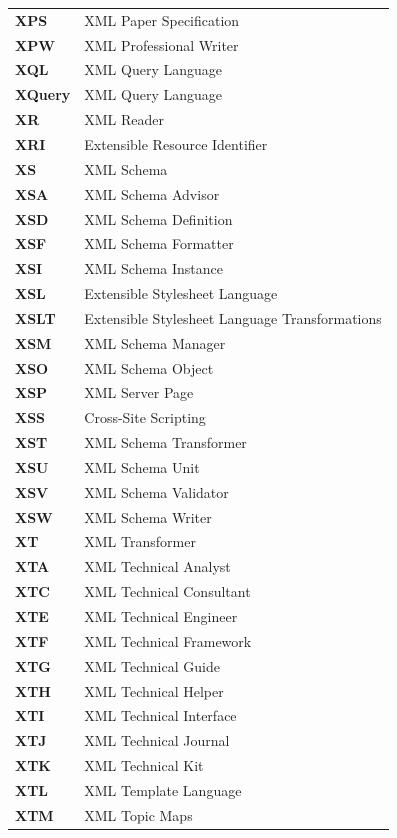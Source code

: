 \begin{longtable}{p{3cm}p{11cm}}
\textbf{XPS} & XML Paper Specification \\
\textbf{XPW} & XML Professional Writer \\
\textbf{XQL} & XML Query Language \\
\textbf{XQuery} & XML Query Language \\
\textbf{XR} & XML Reader \\
\textbf{XRI} & Extensible Resource Identifier \\
\textbf{XS} & XML Schema \\
\textbf{XSA} & XML Schema Advisor \\
\textbf{XSD} & XML Schema Definition \\
\textbf{XSF} & XML Schema Formatter \\
\textbf{XSI} & XML Schema Instance \\
\textbf{XSL} & Extensible Stylesheet Language \\
\textbf{XSLT} & Extensible Stylesheet Language Transformations \\
\textbf{XSM} & XML Schema Manager \\
\textbf{XSO} & XML Schema Object \\
\textbf{XSP} & XML Server Page \\
\textbf{XSS} & Cross-Site Scripting \\
\textbf{XST} & XML Schema Transformer \\
\textbf{XSU} & XML Schema Unit \\
\textbf{XSV} & XML Schema Validator \\
\textbf{XSW} & XML Schema Writer \\
\textbf{XT} & XML Transformer \\
\textbf{XTA} & XML Technical Analyst \\
\textbf{XTC} & XML Technical Consultant \\
\textbf{XTE} & XML Technical Engineer \\
\textbf{XTF} & XML Technical Framework \\
\textbf{XTG} & XML Technical Guide \\
\textbf{XTH} & XML Technical Helper \\
\textbf{XTI} & XML Technical Interface \\
\textbf{XTJ} & XML Technical Journal \\
\textbf{XTK} & XML Technical Kit \\
\textbf{XTL} & XML Template Language \\
\textbf{XTM} & XML Topic Maps \\

\end{longtable}
